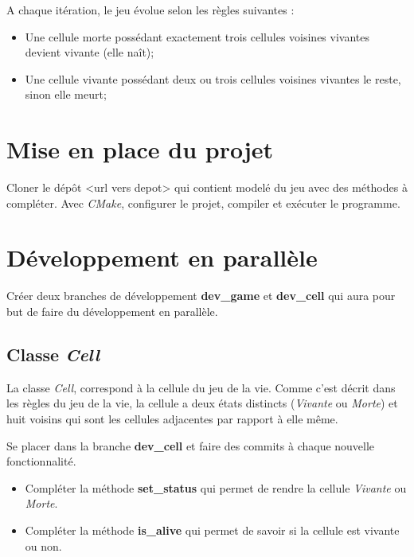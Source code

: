 \medskip

A chaque itération, le jeu évolue selon les règles suivantes :

\medskip

\begin{itemize}
    \item Une cellule morte possédant exactement trois cellules voisines vivantes devient vivante (elle naît);
    \medskip
    \item Une cellule vivante possédant deux ou trois cellules voisines vivantes le reste, sinon elle meurt;
\end{itemize}

\section{Mise en place du projet}
Cloner le dépôt <url vers depot> qui contient modelé du jeu avec des méthodes à compléter.
Avec \textit{CMake}, configurer le projet, compiler et exécuter le programme.

\section{Développement en parallèle}
Créer deux branches de développement \textbf{dev\_game} et \textbf{dev\_cell} qui aura pour but de faire du développement en parallèle. 

\subsection{Classe \textit{Cell}}
La classe \textit{Cell}, correspond à la cellule du jeu de la vie. Comme c'est décrit dans les règles du jeu de la vie, la cellule a deux états distincts (\textit{Vivante} ou \textit{Morte}) et huit voisins qui sont les cellules adjacentes par rapport à elle même.

\medskip

Se placer dans la branche \textbf{dev\_cell} et faire des commits à chaque nouvelle fonctionnalité.

\medskip

\begin{itemize}
    \item Compléter la méthode \textbf{set\_status} qui permet de rendre la cellule \textit{Vivante} ou \textit{Morte}.
    \medskip
    \item Compléter la méthode \textbf{is\_alive} qui permet de savoir si la cellule est vivante ou non.
\end{itemize}

